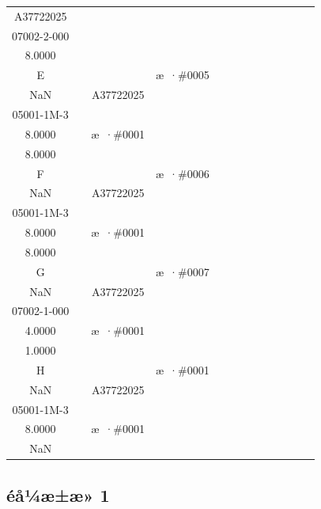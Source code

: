 \documentclass[UTF8,10pt,a4paper,fontset=fandol]{ctexart}
\newcommand{\fieldvalue}[1]{#1}
\begin{document}
\begin{tabular}{c|*{12}{c|}}
\fieldvalue{\scriptsize A37722025\\07002-2-000\\8.0000}&
&&&&\\ \hline
E&&&%
\fieldvalue{\scriptsize æ ·\#0005\\NaN}&
&%
\fieldvalue{\scriptsize A37722025\\05001-1M-3\\8.0000}&
&%
\fieldvalue{\scriptsize æ ·\#0001\\8.0000}&
&&&&\\ \hline
F&&&%
\fieldvalue{\scriptsize æ ·\#0006\\NaN}&
&%
\fieldvalue{\scriptsize A37722025\\05001-1M-3\\8.0000}&
&%
\fieldvalue{\scriptsize æ ·\#0001\\8.0000}&
&&&&\\ \hline
G&&&%
\fieldvalue{\scriptsize æ ·\#0007\\NaN}&
&%
\fieldvalue{\scriptsize A37722025\\07002-1-000\\4.0000}&
&%
\fieldvalue{\scriptsize æ ·\#0001\\1.0000}&
&&&&\\ \hline
H&&&%
\fieldvalue{\scriptsize æ ·\#0001\\NaN}&
&%
\fieldvalue{\scriptsize A37722025\\05001-1M-3\\8.0000}&
&%
\fieldvalue{\scriptsize æ ·\#0001\\NaN}&
&&&&\\ \hline
\end{tabular}

\subsection{éå¼æ±æ» 1}
\end{document}
